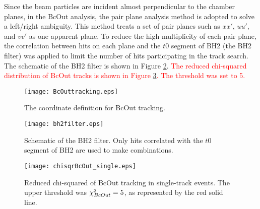 Since the beam particles are incident almost perpendicular to the chamber planes, in the BcOut analysis, the pair plane analysis method is adopted to solve a left/right ambiguity. This method treats a set of pair planes such as $xx'$, $uu'$, and $vv'$ as one apparent plane. To reduce the high multiplicity of each pair plane, the correlation between hits on each plane and the $t0$ segment of BH2 (the BH2 filter) was applied to limit the number of hits participating in the track search. The schematic of the BH2 filter is shown in Figure \ref{fig-bh2filter}. \textcolor{red}{The reduced chi-squared distribution of BcOut tracks is shown in Figure \ref{fig-chisqrBcOut}. The threshold was set to 5.}

\begin{figure}[!h]
  \begin{center}
    \texttt{[image: BcOuttracking.eps]}
    \caption{The coordinate definition for BcOut tracking.}
    \label{fig-BcOuttracking}
  \end{center}
\end{figure}

\begin{figure}[!h]
  \begin{center}
    \texttt{[image: bh2filter.eps]}
    \caption{Schematic of the BH2 filter. Only hits correlated with the $t0$ segment of BH2 are used to make combinations.}
    \label{fig-bh2filter}
  \end{center}
\end{figure}

\begin{figure}[!h]
  \begin{center}
    \texttt{[image: chisqrBcOut\_single.eps]}
    \caption{Reduced chi-squared of BcOut tracking in single-track events. The upper threshold was $\chi^{2}_{BcOut}=5$, as represented by the red solid line.}
    \label{fig-chisqrBcOut}
  \end{center}
\end{figure}

